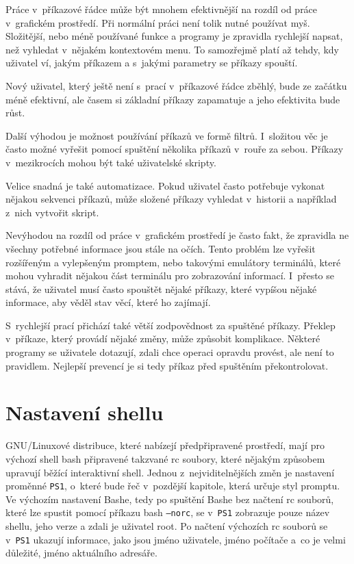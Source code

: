 \documentclass[thesis=M,czech]{FITthesis}[2012/06/26]
\begin{document}
Práce v~příkazové řádce může být mnohem efektivnější na rozdíl od práce v~grafickém prostředí. Při normální práci není tolik nutné používat myš. Složitější, nebo méně používané funkce a programy je zpravidla rychlejší napsat, než vyhledat v~nějakém kontextovém menu. To samozřejmě platí až tehdy, kdy uživatel ví, jakým příkazem a s~jakými parametry se příkazy spouští.

Nový uživatel, který ještě není s~prací v~příkazové řádce zběhlý, bude ze začátku méně efektivní, ale časem si základní příkazy zapamatuje a jeho efektivita bude růst.

Další výhodou je možnost používání příkazů ve formě filtrů. I~složitou věc je často možné vyřešit pomocí spuštění několika příkazů v~rouře za sebou. Příkazy v~mezikrocích mohou být také uživatelské skripty.

Velice snadná je také automatizace. Pokud uživatel často potřebuje vykonat nějakou sekvenci příkazů, může složené příkazy vyhledat v~historii a například z~nich vytvořit skript.

Nevýhodou na rozdíl od práce v~grafickém prostředí je často fakt, že zpravidla ne všechny potřebné informace jsou stále na očích. Tento problém lze vyřešit rozšířeným a vylepšeným promptem, nebo takovými emulátory terminálů, které mohou vyhradit nějakou část terminálu pro zobrazování informací. I~přesto se stává, že uživatel musí často spouštět nějaké příkazy, které vypíšou nějaké informace, aby věděl stav věcí, které ho zajímají.

S~rychlejší prací přichází také větší zodpovědnost za spuštěné příkazy. Překlep v~příkaze, který provádí nějaké změny, může způsobit komplikace. Některé programy se uživatele dotazují, zdali chce operaci opravdu provést, ale není to pravidlem. Nejlepší prevencí je si tedy příkaz před spuštěním překontrolovat.


%
%
%
\section{Nastavení shellu}

GNU/Linuxové distribuce, které nabízejí předpřipravené prostředí, mají pro výchozí shell bash připravené takzvané rc soubory, které nějakým způsobem upravují běžící interaktivní shell. Jednou z~nejviditelnějších změn je nastavení proměnné \texttt{PS1}, o~které bude řeč v~pozdější kapitole, která určuje styl promptu. Ve výchozím nastavení Bashe, tedy po spuštění Bashe bez načtení rc souborů, které lze spustit pomocí příkazu bash \texttt{--norc}, se v~\texttt{PS1} zobrazuje pouze název shellu, jeho verze a zdali je uživatel root. Po načtení výchozích rc souborů se v~\texttt{PS1} ukazují informace, jako jsou jméno uživatele, jméno počítače a~co je velmi důležité, jméno aktuálního adresáře.
\end{document}
